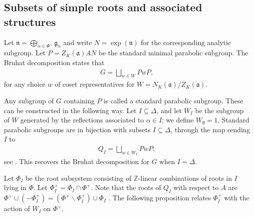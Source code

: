 \documentclass[12pt]{amsart}
\theoremstyle{remark}
\newcommand{\Z}{\mathbb Z}
\begin{document}
\subsection{Subsets of simple roots and associated structures}\label{sec:subsets}
Let $\mathfrak{n} = \bigoplus_{\alpha \in \Phi^+} \mathfrak{g}_\alpha$ and write $N = \exp(\mathfrak{n})$ for the corresponding analytic subgroup. Let $P = Z_K(\mathfrak{a}) A N$ be the standard minimal parabolic subgroup. The Bruhat decomposition states that
\begin{gather*}
    G = \bigsqcup_{w \in W} P w P,
\end{gather*}
for any choice $w$ of coset representatives for $W = N_{K}(\mathfrak{a})/Z_K(\mathfrak{a})$.

Any subgroup of $G$ containing $P$ is called a standard parabolic subgroup. These can be constructed in the following way. Let $I \subseteq \Delta$, and let $W_I$ be the subgroup of $W$ generated by the reflections associated to $\alpha \in I$; we define $W_{\emptyset} = 1$. Standard parabolic subgroups are in bijection with subsets $I\subseteq \Delta$, through the map sending $I$ to
\begin{gather*}
    Q_I = \bigsqcup_{w \in W_I} P w P;
\end{gather*}
see \cite[\S\S 29.2-3]{Humphreys}. This recovers the Bruhat decomposition for $G$ when $I=\Delta$.

Let $\Phi_I$ be the root subsystem consisting of $\Z$-linear combinations of roots in $I$ lying in $\Phi$.  Let $\Phi_I^+=\Phi_I\cap\Phi^+$. Note that the roots of $Q_I$ with respect to $A$ are $\Phi^+\cup(-\Phi_I^+) = (\Phi^+ \smallsetminus \Phi_I^+) \cup \Phi_I$ \cite[\S 30.1, Theorem (b)]{Humphreys}.  The following proposition relates $\Phi_I^+$ with the action of $W_I$ on $\Phi^+$.
\end{document}
